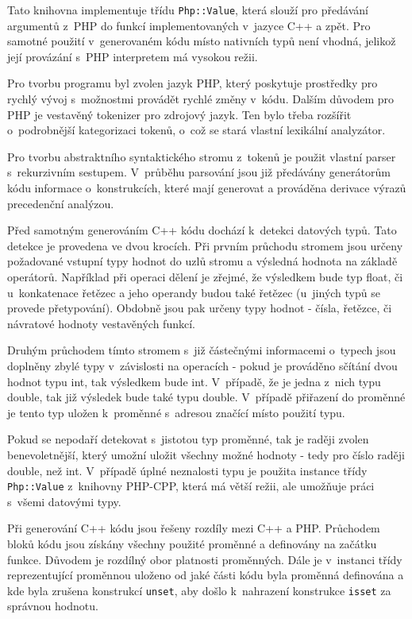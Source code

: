 \documentclass[czech]{ExcelAtFIT}
\newcommand{\function}[1]{\texttt{#1}}
\begin{document}
	Tato knihovna implementuje třídu \function{Php::Value}, která slouží pro předávání argumentů z~PHP do funkcí implementovaných v~jazyce C++ a zpět. Pro samotné použití v~generovaném kódu místo nativních typů není vhodná, jelikož její provázání s~PHP interpretem má vysokou režii.

	Pro tvorbu programu byl zvolen jazyk PHP, který poskytuje prostředky pro rychlý vývoj s~možnostmi provádět rychlé změny v~kódu. Dalším důvodem pro PHP je vestavěný tokenizer pro zdrojový jazyk. Ten bylo třeba rozšířit o~podrobnější kategorizaci tokenů, o~což se stará vlastní lexikální analyzátor.

	Pro tvorbu abstraktního syntaktického stromu z~tokenů je použit vlastní parser s~rekurzivním sestupem. V~průběhu parsování jsou již předávány generátorům kódu informace o~konstrukcích, které mají generovat a prováděna derivace výrazů precedenční analýzou.

	Před samotným generováním C++ kódu dochází k~detekci datových typů. Tato detekce je provedena ve dvou krocích. Při prvním průchodu stromem jsou určeny požadované vstupní typy hodnot do uzlů stromu a výsledná hodnota na základě operátorů. Například při operaci dělení je zřejmé, že výsledkem bude typ float, či u~konkatenace řetězec a jeho operandy budou také řetězec (u~jiných typů se provede přetypování). Obdobně jsou pak určeny typy hodnot - čísla, řetězce, či návratové hodnoty vestavěných funkcí.

	Druhým průchodem tímto stromem s~již částečnými informacemi o~typech jsou doplněny zbylé typy v~zá\-vis\-los\-ti na operacích - pokud je prováděno sčítání dvou hodnot typu int, tak výsledkem bude int. V~případě, že je jedna z~nich typu double, tak již výsledek bude také typu double. V~případě přiřazení do proměnné je tento typ uložen k~proměnné s~adresou značící místo použití typu.

	Pokud se nepodaří detekovat s~jistotou typ pro\-měn\-né, tak je raději zvolen benevoletnější, který umožní uložit všechny možné hodnoty - tedy pro číslo raději double, než int. V~případě úplné neznalosti typu je použita instance třídy \function{Php::Value} z~knihovny PHP-CPP, která má větší režii, ale umožňuje práci s~všemi datovými typy\cite{phpCppPerformance}.

	Při generování C++ kódu jsou řešeny rozdíly mezi C++ a PHP. Průchodem bloků kódu jsou získány všech\-ny použité proměnné a definovány na začátku funkce. Důvodem je rozdílný obor platnosti proměnných. Dále je v~instanci třídy reprezentující proměnnou uloženo od jaké části kódu byla proměnná definována a kde byla zrušena konstrukcí \function{unset}, aby došlo k~nahrazení konstrukce \function{isset} za správnou hodnotu.
\end{document}
